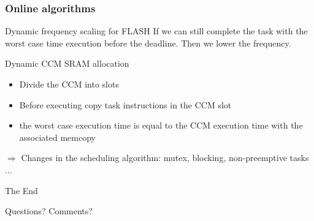 \documentclass[
	11pt, %
]{beamer}
\begin{document}
\begin{frame}
	\frametitle{Online algorithms}
	\begin{block}{Dynamic frequency scaling for FLASH}
		If we can still complete the task with the worst case time execution before the deadline. Then we lower the frequency. 
	\end{block}
	\begin{block}{Dynamic CCM SRAM allocation}
		\begin{itemize}
			\item Divide the CCM into slots
			\item Before executing copy task instructions in the CCM slot
			\item the worst case execution time is equal to the CCM execution time with the associated memcopy
			
		\end{itemize}
		$\Rightarrow$ Changes in the scheduling algorithm: mutex, blocking, non-preemptive tasks $\ldots$

	\end{block}
\end{frame}





\begin{frame}[plain] %
	\begin{center}
		{\Huge The End}
		
		\bigskip\bigskip %
		
		{\LARGE Questions? Comments?}
	\end{center}
\end{frame}

\end{document}

